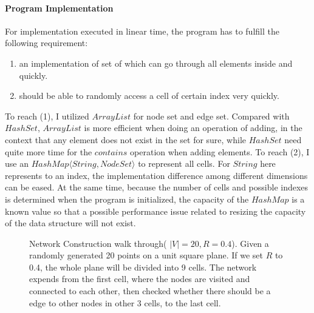 \documentclass[prodmode,acmtecs]{acmsmall} %
\begin{document}
\paragraph{Program Implementation}
For implementation executed in linear time, the program has to fulfill the following requirement:
\begin{enumerate}
\item an implementation of set of which can go through all elements inside and quickly.
\item should be able to randomly access a cell of certain index very quickly.
\end{enumerate}
To reach (1), I utilized $ArrayList$ for node set and edge set. Compared with $HashSet$, $ArrayList$ is more efficient when doing an operation of adding, in the context that any element does not exist in the set for sure, while $HashSet$ need quite more time for the $contains$ operation when adding elements. To reach (2), I use an $HashMap\langle String, NodeSet\rangle$ to represent all cells. For $String$ here represents to an index, the implementation difference among different dimensions can be eased. At the same time, because the number of cells and possible indexes is determined when the program is initialized, the capacity of the $HashMap$ is a known value so that a possible performance issue related to resizing the capacity of the data structure will not exist.
\begin{figure}[b]
\label{fig:networkConseg}
\centerline{
}
\centerline{
}
\caption{Network Construction walk through( $|V| = 20, R = 0.4$). Given a randomly generated 20 points on a unit square plane. If we set $R$ to 0.4, the whole plane will be divided into 9 cells. The network expends from the first cell, where the nodes are visited and connected to each other, then checked whether there should be a edge to other nodes in other 3 cells, to the last cell.}
\end{figure}
\end{document}

